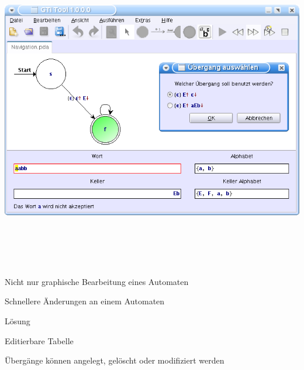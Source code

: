 {
  \begin{center}
    \includegraphics[height=14cm]{../images/grammar_pda.png}
  \end{center}
}


{
    \begin{itemgroup}{}
	\item Nicht nur graphische Bearbeitung eines Automaten
	\item Schnellere Änderungen an einem Automaten
    \end{itemgroup}

    \begin{itemgroup}{Lösung}
	\item Editierbare Tabelle
	\item Übergänge können angelegt, gelöscht oder modifiziert werden
	\end{itemgroup}
    
    \vfill{}
}


